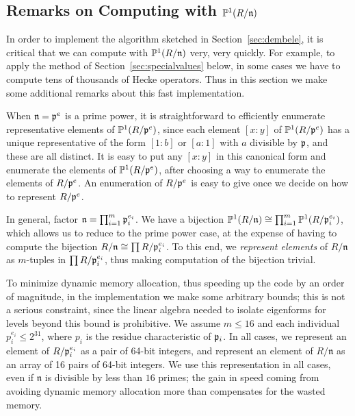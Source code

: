 \documentclass{amsart}
\newcommand{\n}{\mathfrak{n}}
\begin{document}
\subsection{Remarks on Computing with $\P^1(R/\n)$}\label{sec:p1rn}

In order to implement the algorithm sketched in
Section~\ref{sec:dembele}, it is critical that we can compute with
$\P^1(R/\n)$ very, very quickly.  For example, to apply the method of
Section~\ref{sec:specialvalues} below, in some cases we have to
compute tens of thousands of Hecke operators.  Thus in this section we
make some additional remarks about this fast
implementation.

When $\n=\p^e$ is a prime power, it is
straightforward to efficiently enumerate representative elements of
$\mathbb{P}^1(R/\mathfrak{p}^e)$, since each element $[x:y]$ of $\mathbb{P}^1(R/\mathfrak{p}^e)$ has a
unique representative of the form $[1:b]$ or $[a:1]$ with $a$
divisible by $\mathfrak{p}$, and these are all distinct.  It is easy 
to put  any $[x:y]$ 
in this canonical form and enumerate the elements of $\mathbb{P}^1(R/\mathfrak{p}^e)$, after
choosing a way to enumerate the elements of $R/\mathfrak{p}^e$.
An enumeration of $R/\mathfrak{p}^e$ is easy to give
once we decide on how to represent $R/\mathfrak{p}^e$.

In general, factor $\n = \prod_{i=1}^m \p_i^{e_i}$. 
We have a bijection $\P^1(R/\n) \isom \prod_{i=1}^m
\P^1(R/\p_i^{e_i})$, which allows us to reduce to the prime power
case, at the expense of having to compute the bijection 
$R/\n \isom \prod R/\p_i^{e_i}$.
To this end, we {\em represent elements} of $R/\n$ as
$m$-tuples in $\prod R/\mathfrak{p}_i^{e_i}$, thus making
computation of the bijection trivial.  

To minimize dynamic memory allocation, thus speeding up the
code by an order of magnitude, in the implementation
we make some arbitrary
bounds; this is not a serious constraint, since the linear algebra
needed to isolate eigenforms for levels beyond this bound is
prohibitive. We assume $m\leq 16$ and each individual 
$p_i^{e_i}\leq 2^{31}$, where $p_i$ is the residue characteristic of $\mathfrak{p}_i$.  
In all cases, we represent an
element of $R/\mathfrak{p}_i^{e_i}$ as a pair of  64-bit integers, and
represent an element of $R/\n$ as an array of 16 pairs of 64-bit
integers. We use this representation in all cases, even if $\n$ is
divisible by less than $16$ primes; the gain in speed coming
from avoiding dynamic memory allocation more than compensates for the
wasted memory.
\end{document}
